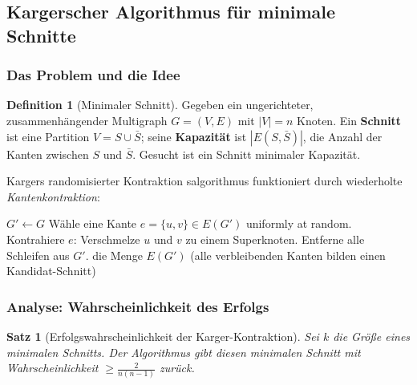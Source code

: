 ﻿\documentclass[12pt,a4paper]{article}
\theoremstyle{definition}
\newtheorem{definition}{Definition}[section]
\theoremstyle{plain}
\newtheorem{satz}{Satz}[section]
\theoremstyle{remark}
\begin{document}
\subsection{Kargerscher Algorithmus für minimale Schnitte}
\label{subsec:karger}

\subsubsection{Das Problem und die Idee}

\begin{definition}[Minimaler Schnitt]\label{def:mincut}
  Gegeben ein ungerichteter, zusammenhängender Multigraph $G=(V,E)$ mit
  $|V|=n$ Knoten. Ein \textbf{Schnitt} ist eine Partition $V = S \cup \bar{S}$;
  seine \textbf{Kapazität} ist $|E(S,\bar{S})|$, die Anzahl der Kanten
  zwischen $S$ und $\bar{S}$. Gesucht ist ein Schnitt minimaler Kapazität.
\end{definition}

Kargers randomisierter Kontraktion salgorithmus \cite{karger1993global}
funktioniert durch wiederholte \emph{Kantenkontraktion}:

\begin{algorithm}[H]
  \caption{Karger-Kontraktion}
  \label{alg:karger}
  \begin{algorithmic}[1]
    \State $G' \gets G$
      \State Wähle eine Kante $e = \{u,v\} \in E(G')$ uniformly at random.
      \State Kontrahiere $e$: Verschmelze $u$ und $v$ zu einem Superknoten.
      \State Entferne alle Schleifen aus $G'$.
    \EndWhile
    \State \Return die Menge $E(G')$ (alle verbleibenden Kanten bilden
           einen Kandidat-Schnitt)
  \end{algorithmic}
\end{algorithm}

\subsubsection{Analyse: Wahrscheinlichkeit des Erfolgs}

\begin{satz}[Erfolgswahrscheinlichkeit der Karger-Kontraktion]\label{satz:kargerprob}
  Sei $k$ die Größe eines minimalen Schnitts. Der Algorithmus gibt diesen
  minimalen Schnitt mit Wahrscheinlichkeit $\geq \frac{2}{n(n-1)}$ zurück.
\end{satz}
\end{document}
